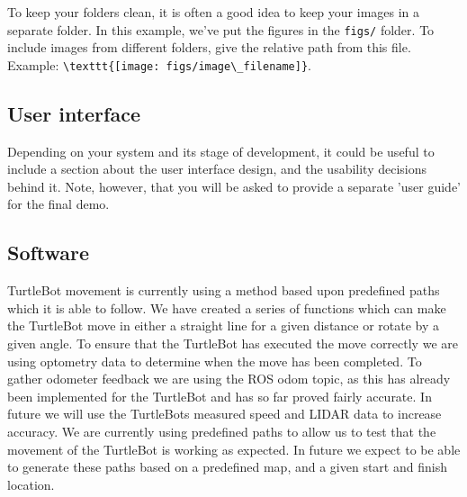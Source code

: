 \documentclass{article}
\begin{document}
To keep your folders clean, it is often a good idea to keep your images in a separate folder. In this example, we've put the figures in the \texttt{figs/} folder. To include images from different folders, give the relative path from this file. Example: \verb+\texttt{[image: figs/image\_filename]}+.


\subsection{User interface}

Depending on your system and its stage of development, it could be useful to include a section about the user interface design, and the usability decisions behind it. Note, however, that you will be asked to provide a separate 'user guide' for the final demo.

\subsection{Software}



TurtleBot movement is currently using a method based upon predefined paths which it is able to follow.
We have created a series of functions which can make the TurtleBot move in either a straight line for a given distance or rotate by a given angle.
To ensure that the TurtleBot has executed the move correctly we are using optometry data to determine when the move has been completed. 
To gather odometer feedback we are using the ROS odom topic, as this has already been implemented for the TurtleBot and has so far proved fairly accurate.
In future we will use the TurtleBots measured speed and LIDAR data to increase accuracy.
We are currently using predefined paths to allow us to test that the movement of the TurtleBot is working as expected. In future we expect to be able to generate these paths based on a predefined map, and a given start and finish location.
\end{document}
